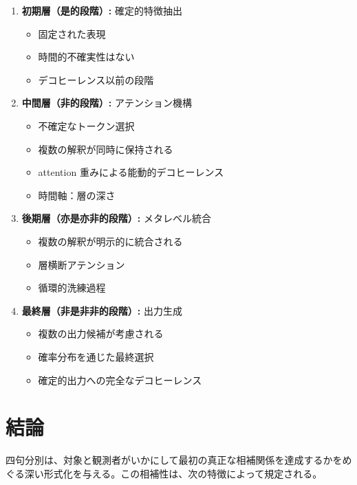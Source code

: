 \documentclass[12pt,a4paper]{article}
\theoremstyle{definition}
\begin{document}
\begin{enumerate}
    \item \textbf{初期層（是的段階）:} 確定的特徴抽出
    \begin{itemize}
        \item 固定された表現
        \item 時間的不確実性はない
        \item デコヒーレンス以前の段階
    \end{itemize}
    
    \item \textbf{中間層（非的段階）:} アテンション機構
    \begin{itemize}
        \item 不確定なトークン選択
        \item 複数の解釈が同時に保持される
        \item attention 重みによる能動的デコヒーレンス
        \item 時間軸：層の深さ
    \end{itemize}
    
    \item \textbf{後期層（亦是亦非的段階）:} メタレベル統合
    \begin{itemize}
        \item 複数の解釈が明示的に統合される
        \item 層横断アテンション
        \item 循環的洗練過程
    \end{itemize}
    
    \item \textbf{最終層（非是非非的段階）:} 出力生成
    \begin{itemize}
        \item 複数の出力候補が考慮される
        \item 確率分布を通じた最終選択
        \item 確定的出力への完全なデコヒーレンス
    \end{itemize}
\end{enumerate}

\section{結論}

四句分別は、対象と観測者がいかにして最初の真正な相補関係を達成するかをめぐる深い形式化を与える。この相補性は、次の特徴によって規定される。
\end{document}
